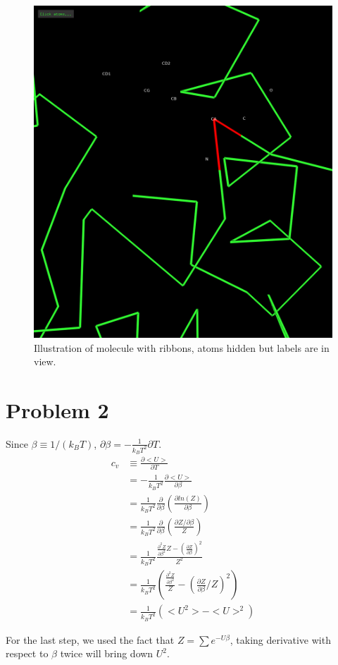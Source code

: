 \documentclass[11pt]{article}
\begin{document}
\begin{figure}[htbp]
\centering
\includegraphics[width=.9\linewidth]{./ribbons.png}
\caption{Illustration of molecule with ribbons, atoms hidden but labels are in view.}
\end{figure}

\section{Problem 2}
\label{sec:orgf175cd7}
Since \(\beta \equiv 1/(k_{B}T)\), \(\partial \beta = -
\frac{1}{k_{B}T^{2}}\partial T\).
\begin{align}
c_{v}    & \equiv \frac{\partial <U>}{\partial T} \\
        & =  - \frac{1}{k_{B}T^{2}} \frac{\partial <U>}{\partial \beta} \\
        & =  \frac{1}{k_{B}T^{2}} \frac{\partial }{\partial \beta} (\frac{\partial ln(Z)}{\partial \beta}) \\
        & =  \frac{1}{k_{B}T^{2}} \frac{\partial }{\partial \beta} (\frac{\partial Z /\partial \beta}{Z}) \\
 & = \frac{1}{k_{B}T^{2}} \frac{\frac{\partial^{2}Z}{\partial\beta^{2}} Z - (\frac{\partial Z}{\partial\beta})^{2}}{Z^{2}} \\
 & = \frac{1}{k_{B}T^{2}} (\frac{\frac{\partial^{2}Z}{\partial\beta^{2}}}{Z} - (\frac{\partial Z}{\partial \beta} / Z)^{2}) \\
& = \frac{1}{k_{B}T^{2}} (<U^{2}> - <U>^{2})
\end{align}

For the last step, we used the fact that \(Z = \sum e^{-U\beta}\), taking
derivative with respect to \(\beta\) twice will bring down \(U^{2}\).
\end{document}

